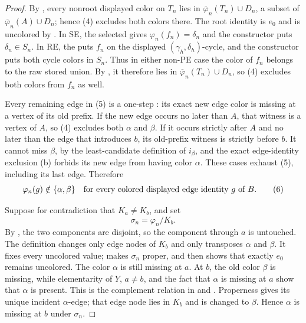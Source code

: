 \begin{proof}
By , every nonroot displayed color on
$T_n$ lies in
$\overline\varphi_n(T_n)\cup D_n$, a subset of
$\overline\varphi_n(A)\cup D_n$; hence (4) excludes both colors there.
The root identity is $e_0$ and is uncolored by
.  In SE, the selected
 gives
$\varphi_n(f_n)=\delta_n$ and the constructor puts
$\delta_n\in S_n$.  In RE, the
 puts $f_n$ on the displayed
$(\gamma_h,\delta_h)$-cycle, and the constructor puts both cycle colors
in $S_n$.  Thus in either non-PE case the color of $f_n$ belongs to the
raw stored union.  By , it therefore lies
in $\overline\varphi_n(T_n)\cup D_n$, so (4) excludes both colors from
$f_n$ as well.

Every remaining edge in (5) is a one-step
: its exact new edge color is missing at a
vertex of its old prefix.  If the new edge occurs no later than $A$, that
witness is a vertex of $A$, so (4) excludes both $\alpha$ and $\beta$.
If it occurs strictly after $A$ and no later than the edge that introduces
$b$, its old-prefix witness is strictly before $b$.  It cannot miss
$\beta$, by the least-candidate definition of $i_\beta$, and the exact
edge-identity exclusion (b) forbids its new edge from having color
$\alpha$.  These cases exhaust (5), including its last edge.  Therefore
\[
  \varphi_n(g)\notin\{\alpha,\beta\}
  \quad\hbox{for every colored displayed edge identity }g\hbox{ of }B.
                                                                    \tag{6}
\]

Suppose for contradiction that $K_a\ne K_b$, and set
\[
             \sigma_n=\varphi_n/K_b.
\]
By , the two components are disjoint,
so the component through $a$ is untouched.  The definition
 changes only edge nodes of $K_b$ and only
transposes $\alpha$ and $\beta$.  It fixes every uncolored value;
 makes $\sigma_n$ proper, and
 then shows that exactly $e_0$ remains
uncolored.  The color $\alpha$ is still missing at $a$.  At $b$, the old
color $\beta$ is missing, while elementarity of $Y$, $a\ne b$, and the
fact that $\alpha$ is missing at $a$ show that $\alpha$ is present.
This is the complement relation in  and
.  Properness gives its unique incident
$\alpha$-edge; that edge node lies in
$K_b$ and is changed to $\beta$.  Hence $\alpha$ is missing at $b$ under
$\sigma_n$.                                                     


\end{proof}
